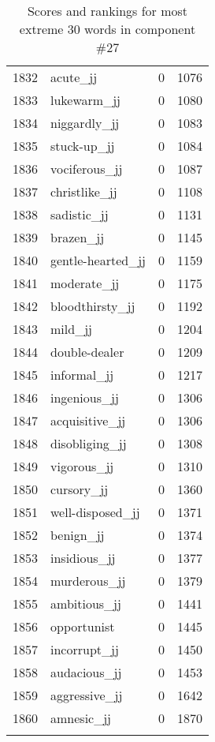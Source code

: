 \begin{longtable}[!htbp]{| rlr@{.}l |}
    1832 & acute\_jj & 0 & 1076 \\
    1833 & lukewarm\_jj & 0 & 1080 \\
    1834 & niggardly\_jj & 0 & 1083 \\
    1835 & stuck-up\_jj & 0 & 1084 \\
    1836 & vociferous\_jj & 0 & 1087 \\
    1837 & christlike\_jj & 0 & 1108 \\
    1838 & sadistic\_jj & 0 & 1131 \\
    1839 & brazen\_jj & 0 & 1145 \\
    1840 & gentle-hearted\_jj & 0 & 1159 \\
    1841 & moderate\_jj & 0 & 1175 \\
    1842 & bloodthirsty\_jj & 0 & 1192 \\
    1843 & mild\_jj & 0 & 1204 \\
    1844 & double-dealer & 0 & 1209 \\
    1845 & informal\_jj & 0 & 1217 \\
    1846 & ingenious\_jj & 0 & 1306 \\
    1847 & acquisitive\_jj & 0 & 1306 \\
    1848 & disobliging\_jj & 0 & 1308 \\
    1849 & vigorous\_jj & 0 & 1310 \\
    1850 & cursory\_jj & 0 & 1360 \\
    1851 & well-disposed\_jj & 0 & 1371 \\
    1852 & benign\_jj & 0 & 1374 \\
    1853 & insidious\_jj & 0 & 1377 \\
    1854 & murderous\_jj & 0 & 1379 \\
    1855 & ambitious\_jj & 0 & 1441 \\
    1856 & opportunist & 0 & 1445 \\
    1857 & incorrupt\_jj & 0 & 1450 \\
    1858 & audacious\_jj & 0 & 1453 \\
    1859 & aggressive\_jj & 0 & 1642 \\
    1860 & amnesic\_jj & 0 & 1870 \\
    \hline
    \caption{Scores and rankings for most extreme 30 words in component \#27} \\
\end{longtable}
